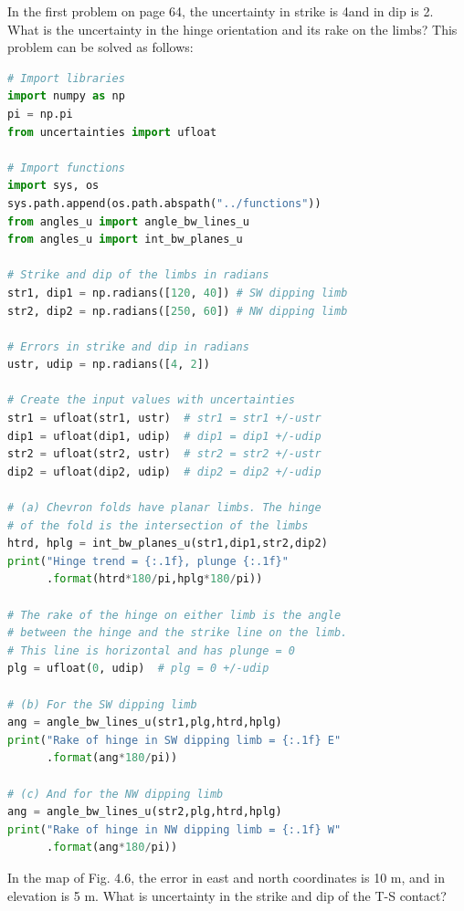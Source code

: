 \documentclass[a4paper , 12pt]{book}
\begin{document}
In the first problem on page 64, the uncertainty in strike is 4\degree\space and in dip is 2\degree. What is the uncertainty in the hinge orientation and its rake on the limbs? This problem can be solved as follows:

\begin{center}
\begin{lstlisting}[language=Python, frame=single]
# Import libraries
import numpy as np
pi = np.pi
from uncertainties import ufloat

# Import functions
import sys, os
sys.path.append(os.path.abspath("../functions"))
from angles_u import angle_bw_lines_u
from angles_u import int_bw_planes_u

# Strike and dip of the limbs in radians
str1, dip1 = np.radians([120, 40]) # SW dipping limb
str2, dip2 = np.radians([250, 60]) # NW dipping limb

# Errors in strike and dip in radians
ustr, udip = np.radians([4, 2])

# Create the input values with uncertainties
str1 = ufloat(str1, ustr)  # str1 = str1 +/-ustr
dip1 = ufloat(dip1, udip)  # dip1 = dip1 +/-udip
str2 = ufloat(str2, ustr)  # str2 = str2 +/-ustr
dip2 = ufloat(dip2, udip)  # dip2 = dip2 +/-udip

# (a) Chevron folds have planar limbs. The hinge
# of the fold is the intersection of the limbs
htrd, hplg = int_bw_planes_u(str1,dip1,str2,dip2)
print("Hinge trend = {:.1f}, plunge {:.1f}"
      .format(htrd*180/pi,hplg*180/pi))

# The rake of the hinge on either limb is the angle 
# between the hinge and the strike line on the limb. 
# This line is horizontal and has plunge = 0
plg = ufloat(0, udip)  # plg = 0 +/-udip

# (b) For the SW dipping limb
ang = angle_bw_lines_u(str1,plg,htrd,hplg)
print("Rake of hinge in SW dipping limb = {:.1f} E"
      .format(ang*180/pi))

# (c) And for the NW dipping limb
ang = angle_bw_lines_u(str2,plg,htrd,hplg)
print("Rake of hinge in NW dipping limb = {:.1f} W"
      .format(ang*180/pi))
\end{lstlisting}
\end{center}

In the map of Fig. 4.6, the error in east and north coordinates is 10 m, and in elevation is 5 m. What is uncertainty in the strike and dip of the T-S contact?
\end{document}
